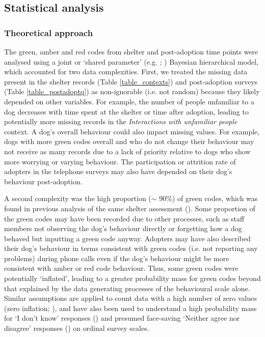 \documentclass[12pt]{article}
\begin{document}
\subsection{Statistical analysis}

\subsubsection{Theoretical approach}\label{sec_theoretical_approach}
The green, amber and red codes from shelter and post-adoption time points were analysed using a joint or `shared parameter' (e.g. \cite{vonesh2006}; \cite{tseng2016}) Bayesian hierarchical model, which accounted for two data complexities. First, we treated the missing data present in the shelter records (Table \ref{table_contexts}) and post-adoption surveys (Table \ref{table_postadoptq}) as non-ignorable (i.e. not random) because they likely depended on other variables. For example, the number of people unfamiliar to a dog decreases with time spent at the shelter or time after adoption, leading to potentially more missing records in the \textit{Interactions with unfamiliar people} context. A dog’s overall behaviour could also impact missing values. For example, dogs with more green codes overall and who do not change their behaviour may not receive as many records due to a lack of priority relative to dogs who show more worrying or varying behaviour. The participation or attrition rate of adopters in the telephone surveys may also have depended on their dog’s behaviour post-adoption.

A second complexity was the high proportion ($\sim$ 90\%) of green codes, which was found in previous analysis of the same shelter assessment (\cite{goold2017modelling}). Some proportion of the green codes may have been recorded due to other processes, such as staff members not observing the dog’s behaviour directly or forgetting how a dog behaved but inputting a green code anyway. Adopters may have also described their dog’s behaviour in terms consistent with green codes (i.e. not reporting any problems) during phone calls even if the dog’s behaviour might be more consistent with amber or red code behaviour. Thus, some green codes were potentially ‘inflated’, leading to a greater probability mass for green codes beyond that explained by the data generating processes of the behavioural scale alone. Similar assumptions are applied to count data with a high number of zero values (zero inflation; \cite{lambert1992}), and have also been used to understand a high probability mass for ‘I don’t know’ responses (\cite{kelley2008}) and presumed face-saving ‘Neither agree nor disagree’ responses (\cite{bagozzi2012}) on ordinal survey scales.
\end{document}
